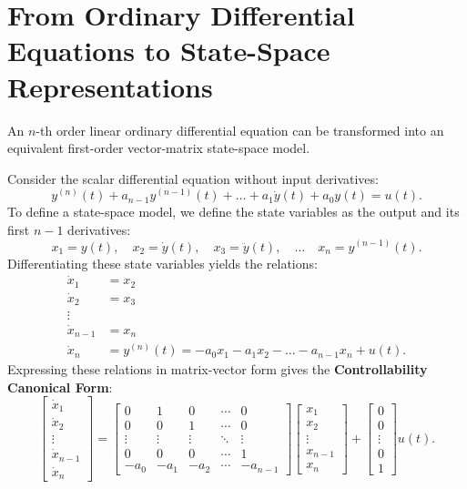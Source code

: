 \section{From Ordinary Differential Equations to State-Space Representations}
An $n$-th order linear ordinary differential equation can be transformed into an equivalent first-order vector-matrix state-space model.

Consider the scalar differential equation without input derivatives:
\begin{equation}
y^{(n)}(t) + a_{n-1} y^{(n-1)}(t) + \dots + a_1 \dot{y}(t) + a_0 y(t) = u(t) .
\end{equation}
To define a state-space model, we define the state variables as the output and its first $n-1$ derivatives:
\begin{equation}
x_1 = y(t), \quad x_2 = \dot{y}(t), \quad x_3 = \ddot{y}(t), \quad \dots \quad x_n = y^{(n-1)}(t) .
\end{equation}
Differentiating these state variables yields the relations:
\begin{align}
    \dot{x}_1 &= x_2 \\
    \dot{x}_2 &= x_3 \\
    \vdots \\
    \dot{x}_{n-1} &= x_n \\
\dot{x}_n &= y^{(n)}(t) = -a_0 x_1 - a_1 x_2 - \dots - a_{n-1} x_n + u(t) .
\end{align}
Expressing these relations in matrix-vector form gives the \textbf{Controllability Canonical Form}:
\begin{equation}
    \begin{bmatrix} \dot{x}_1 \\ \dot{x}_2 \\ \vdots \\ \dot{x}_{n-1} \\ \dot{x}_n \end{bmatrix} = \begin{bmatrix}
        0 & 1 & 0 & \cdots & 0 \\
        0 & 0 & 1 & \cdots & 0 \\
        \vdots & \vdots & \vdots & \ddots & \vdots \\
        0 & 0 & 0 & \cdots & 1 \\
        -a_0 & -a_1 & -a_2 & \cdots & -a_{n-1}
\end{bmatrix} \begin{bmatrix} x_1 \\ x_2 \\ \vdots \\ x_{n-1} \\ x_n \end{bmatrix} + \begin{bmatrix} 0 \\ 0 \\ \vdots \\ 0 \\ 1 \end{bmatrix} u(t) .
\end{equation}
